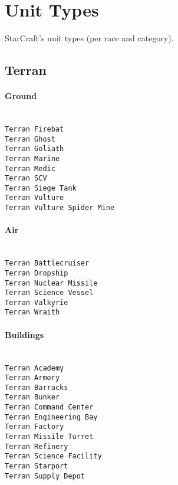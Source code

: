 \newpage
\section{Unit Types}
\label{unittype}
StarCraft's unit types (per race and category).

\subsection{Terran}

\paragraph{Ground} \mbox{}\\
\verb|Terran Firebat| \\
\verb|Terran Ghost| \\
\verb|Terran Goliath| \\
\verb|Terran Marine| \\
\verb|Terran Medic| \\
\verb|Terran SCV| \\
\verb|Terran Siege Tank| \\
\verb|Terran Vulture| \\
\verb|Terran Vulture Spider Mine| \\

\paragraph{Air} \mbox{}\\
\verb|Terran Battlecruiser| \\
\verb|Terran Dropship| \\
\verb|Terran Nuclear Missile| \\
\verb|Terran Science Vessel| \\
\verb|Terran Valkyrie| \\
\verb|Terran Wraith|

\paragraph{Buildings} \mbox{}\\
\verb|Terran Academy| \\
\verb|Terran Armory| \\
\verb|Terran Barracks| \\
\verb|Terran Bunker| \\
\verb|Terran Command Center| \\
\verb|Terran Engineering Bay| \\
\verb|Terran Factory| \\
\verb|Terran Missile Turret| \\
\verb|Terran Refinery| \\
\verb|Terran Science Facility| \\
\verb|Terran Starport| \\
\verb|Terran Supply Depot|


